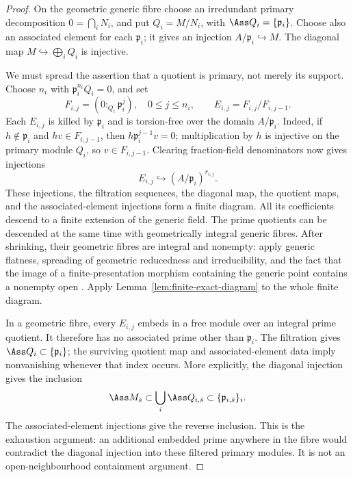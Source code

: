 \begin{proof}
On the geometric generic fibre choose an irredundant primary
 decomposition \(0=\bigcap_i N_i\), and put \(Q_i=M/N_i\), with
\(\Ass Q_i=\{\mathfrak p_i\}\).  Choose also an associated element
for each \(\mathfrak p_i\); it gives an injection
\(A/\mathfrak p_i\hookrightarrow M\).  The diagonal map
\(M\hookrightarrow\bigoplus_i Q_i\) is injective.

We must spread the assertion that a quotient is primary, not merely its
support.  Choose \(n_i\) with \(\mathfrak p_i^{n_i}Q_i=0\), and set
\[
 F_{i,j}=(0:_{Q_i}\mathfrak p_i^j),\quad 0\le j\le n_i,
 \qquad E_{i,j}=F_{i,j}/F_{i,j-1}.
\]
Each \(E_{i,j}\) is killed by \(\mathfrak p_i\) and is torsion-free
over the domain \(A/\mathfrak p_i\).  Indeed, if
\(h\notin\mathfrak p_i\) and \(hv\in F_{i,j-1}\), then
\(h\mathfrak p_i^{j-1}v=0\); multiplication by \(h\) is injective
on the primary module \(Q_i\), so \(v\in F_{i,j-1}\).  Clearing
fraction-field denominators now gives injections
\[
 E_{i,j}\hookrightarrow (A/\mathfrak p_i)^{r_{i,j}}.
\]
These injections, the filtration sequences, the diagonal map, the
quotient maps, and the associated-element injections form a finite
diagram.  All its coefficients descend to a finite extension of the
generic field.  The prime quotients can be descended at the same time
with geometrically integral generic fibres.  After shrinking, their
geometric fibres are integral and nonempty: apply generic flatness,
spreading of geometric reducedness and irreducibility, and the fact
that the image of a finite-presentation morphism containing the generic
point contains a nonempty open
\cite[Sections 37.26--37.27]{StacksGeometricFibres}.
Apply Lemma~\ref{lem:finite-exact-diagram} to the whole finite diagram.

In a geometric fibre, every \(E_{i,j}\) embeds in a free module over
an integral prime quotient.  It therefore has no associated prime
other than \(\mathfrak p_i\).  The filtration gives
\(\Ass Q_i\subset\{\mathfrak p_i\}\); the surviving quotient map
and associated-element data imply nonvanishing whenever that index
occurs.  More explicitly, the diagonal injection gives the inclusion
\[
 \Ass M_{\bar s}\subset\bigcup_i\Ass Q_{i,\bar s}
 \subset\{\mathfrak p_{i,\bar s}\}_i.
\]
The associated-element injections give the reverse inclusion.  This
is the exhaustion argument: an additional embedded prime anywhere in
the fibre would contradict the diagonal injection into these filtered
primary modules.  It is not an open-neighbourhood containment argument.


\end{proof}

